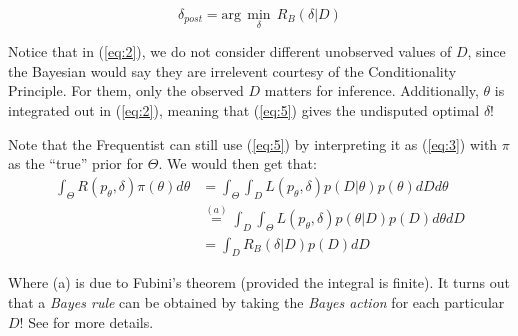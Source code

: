 \documentclass[]{article}
\theoremstyle{mattstyle}
\theoremstyle{definition}
\begin{document}
\begin{equation}\label{eq:5}
\delta_{post}= \text{arg}\,\min\limits_{\delta}\,R_B(\delta|D)
\end{equation}


Notice that in (\ref{eq:2}), we do not consider different unobserved values of \(D\), since the Bayesian would say they are irrelevent courtesy of the Conditionality Principle. For them, only the observed $D$ matters for inference. 
Additionally, \(\theta\) is integrated out in (\ref{eq:2}), meaning that (\ref{eq:5}) gives the undisputed optimal \(\delta\)! 

Note that the Frequentist can still use (\ref{eq:5}) by interpreting it as (\ref{eq:3}) with \(\pi\) as the ``true'' prior for \(\Theta\).
We would then get that:
\begin{align*}
\int_{\Theta}^{}R(p_\theta,\delta)\pi(\theta)d\theta &= \int_{\Theta}^{}\int_{D}L(p_\theta,\delta)p(D|\theta)p(\theta)dDd\theta \\&\overset{(a)}{=} \int_{D}^{}\int_{\Theta}L(p_\theta,\delta)p(\theta|D)p(D)d\theta dD\\
&=\int_{D}^{}R_B(\delta|D)p(D)dD
\end{align*}

Where (a) is due to Fubini's theorem (provided the integral is finite).
It turns out that a \emph{Bayes rule} can be obtained by taking the \emph{Bayes action} for each particular $D$! See \cite{PHoffNotes2} for more details.

\newpage
\end{document}
